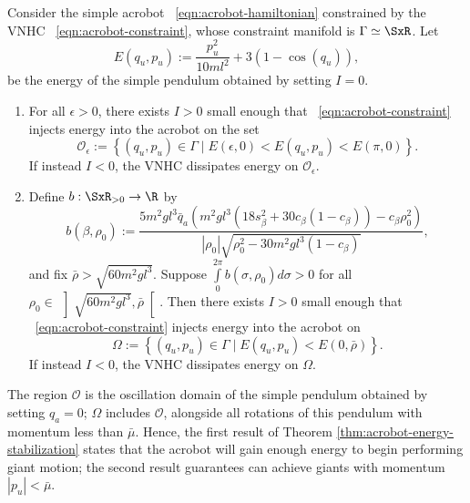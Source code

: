 \begin{thm}\label{thm:acrobot-energy-stabilization}
    Consider the simple acrobot ~\eqref{eqn:acrobot-hamiltonian} constrained by
    the VNHC ~\eqref{eqn:acrobot-constraint}, whose
    constraint manifold is \(\Gamma \simeq \SxR\).
    Let 
    \[
        E(q_u,p_u) := \frac{p_u^2}{10ml^2} + 3(1 - \cos(q_u))
        ,
    \]
    be the energy of the simple pendulum obtained by setting \(I = 0\).
\begin{enumerate}
    \item For all \(\epsilon > 0\), there exists \(I > 0\) small enough that 
    ~\eqref{eqn:acrobot-constraint} injects energy into the acrobot on the set
    \[
        \mathcal{O}_\epsilon := \left\{(q_u,p_u) \in \Gamma 
        \mid E(\epsilon,0) < E(q_u,p_u) < E(\pi,0) \right\}
        .
    \]
    If instead \(I < 0\), the VNHC dissipates energy on \(\mathcal{O}_\epsilon\).
\item Define \(b : \SxR_{> 0} \rightarrow \R\) by
    \[
        b(\beta,\rho_0) := 
        \frac{5m^2 g l^3 \bar{q}_a \left(
            m^2gl^3\left(18s_\beta^2 + 30c_\beta(1 - c_\beta)\right)
            - c_\beta\rho_0^2
        \right)}{
        |\rho_0|\sqrt{\rho_0^2 - 30m^2gl^3(1 - c_\beta)}
        }
        ,
    \]
    and fix \(\bar{\rho} > \sqrt{60m^2gl^3}\).
    Suppose \(\int \limits_{0}^{2\pi} b(\sigma,\rho_0)d\sigma > 0\) for all 
    \(\rho_0 \in \, \left]\sqrt{60m^2gl^3}, \bar{\rho}\right[\).
    Then there exists \(I > 0\) small enough that
    ~\eqref{eqn:acrobot-constraint} injects energy into the acrobot on
    \[
        \Omega := \left\{(q_u,p_u) \in \Gamma 
            \mid E(q_u,p_u) < E(0,\bar{\rho})\right\}
        .
    \]
    If instead \(I < 0\), the VNHC dissipates energy on \(\Omega\).
\end{enumerate}
\end{thm}
The region \(\mathcal{O}\) is the oscillation domain of the simple pendulum
obtained by setting \(q_a = 0\);
\(\Omega\) includes \(\mathcal{O}\), alongside all rotations of this 
pendulum with momentum less than \(\bar{\mu}\). 
Hence, the first result of Theorem \ref{thm:acrobot-energy-stabilization} states
that the acrobot will gain enough energy to begin performing giant motion;
the second result guarantees can achieve giants with momentum
\(|p_u| < \bar{\mu}\).

